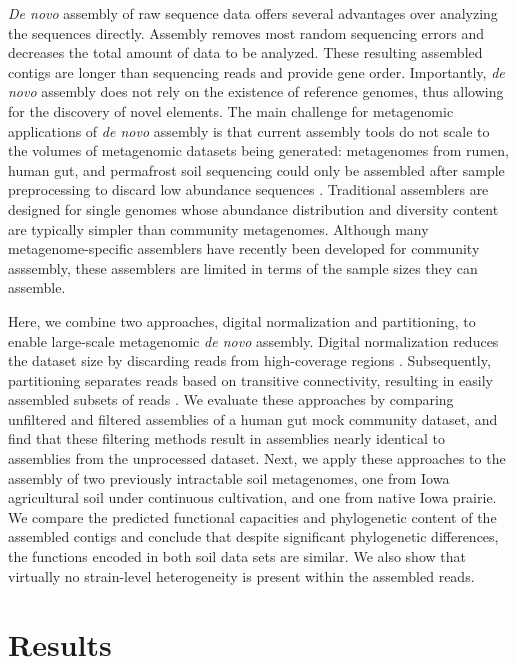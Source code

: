 \documentclass[11pt]{article} %
\begin{document}
\emph{De novo} assembly of raw sequence data offers several advantages
over analyzing the sequences directly.  Assembly removes most random
sequencing errors and decreases the total amount of data to be
analyzed.  These resulting assembled contigs are longer than
sequencing reads and provide gene order.  Importantly, \emph{de novo}
assembly does not rely on the existence of reference genomes, thus
allowing for the discovery of novel elements.  The main challenge for
metagenomic applications of \emph{de novo} assembly is that current
assembly tools do not scale to the volumes of metagenomic datasets
being generated: metagenomes from rumen, human gut, and permafrost
soil sequencing could only be assembled after sample preprocessing to
discard low abundance sequences
\cite{Hess:2011p686,Mackelprang:2011p1087,Qin:2010p189}.  Traditional
assemblers are designed for single genomes whose abundance
distribution and diversity content are typically simpler than
community metagenomes.  Although many metagenome-specific assemblers
have recently been developed for community asssembly, these assemblers
are limited in terms of the sample sizes they can assemble.

Here, we combine two approaches, digital normalization and
partitioning, to enable large-scale metagenomic {\em de novo}
assembly.  Digital normalization reduces the dataset size by
discarding reads from high-coverage regions \cite{browndiginorm}.  Subsequently,
partitioning separates reads based on transitive connectivity,
resulting in easily assembled subsets of reads \cite{howeartifacts,Pell:2012cq}.  We
evaluate these approaches by comparing unfiltered and filtered
assemblies of a human gut mock community dataset, and find that these
filtering methods result in assemblies nearly identical to assemblies
from the unprocessed dataset.  Next, we apply these approaches to the
assembly of two previously intractable soil metagenomes, one from Iowa
agricultural soil under continuous cultivation, and one from native
Iowa prairie.  We compare the predicted functional capacities and
phylogenetic content of the assembled contigs and conclude that despite
significant phylogenetic differences, the functions encoded in both
soil data sets are similar.  We also show that virtually no
strain-level heterogeneity is present within the assembled reads.

\section{Results}
\end{document}
